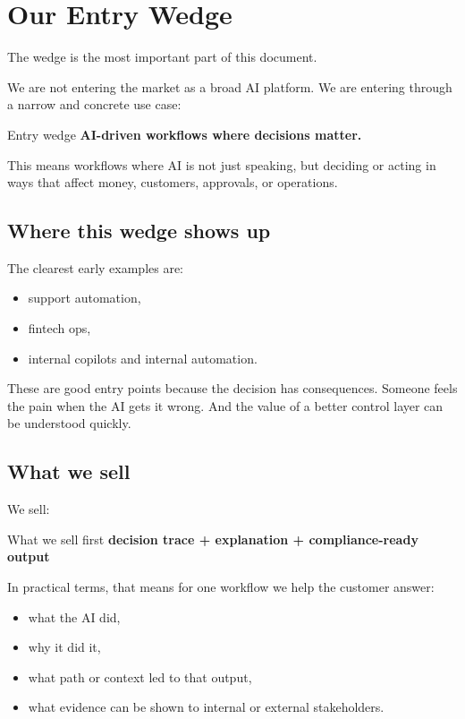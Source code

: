 \chapter{Our Entry Wedge}

The wedge is the most important part of this document.

We are not entering the market as a broad AI platform.
We are entering through a narrow and concrete use case:

\begin{conceptbox}{Entry wedge}
\centering
\Large\bfseries AI-driven workflows where decisions matter.
\end{conceptbox}

This means workflows where AI is not just speaking, but deciding or acting in ways that affect money, customers, approvals, or operations.

\section{Where this wedge shows up}

The clearest early examples are:

\begin{itemize}
  \item support automation,
  \item fintech ops,
  \item internal copilots and internal automation.
\end{itemize}

These are good entry points because the decision has consequences.
Someone feels the pain when the AI gets it wrong.
And the value of a better control layer can be understood quickly.

\section{What we sell}

We sell:

\begin{insightbox}{What we sell first}
\centering
\Large\bfseries decision trace + explanation + compliance-ready output
\end{insightbox}

In practical terms, that means for one workflow we help the customer answer:

\begin{itemize}
  \item what the AI did,
  \item why it did it,
  \item what path or context led to that output,
  \item what evidence can be shown to internal or external stakeholders.
\end{itemize}

